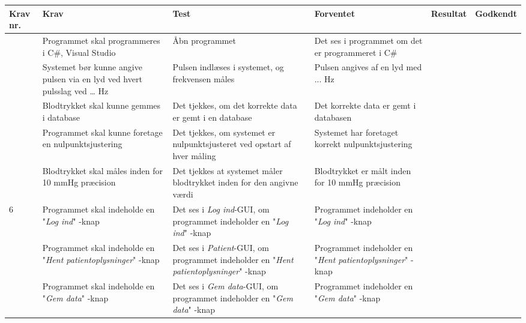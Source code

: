 \begin{longtable}{|>{\raggedright\arraybackslash}p{1.1cm}| >{\raggedright\arraybackslash}p{2.7cm} | >{\raggedright\arraybackslash}p{2.7cm} | >{\raggedright\arraybackslash}p{2.7cm} | >{\raggedright\arraybackslash}p{2.2cm} |>{\raggedright\arraybackslash}p{2.2cm}|}
   \hline
\textbf{Krav nr.} & \textbf{Krav}	&	\textbf{Test}	&	\textbf{Forventet}	&\textbf{Resultat}	&	\textbf{Godkendt} \\
\hline
1	&	Programmet skal programmeres i C$\#$, Visual Studio &	 Åbn programmet	& 	Det ses i programmet om det er programmeret i C$\#$	&	\\
\hline
2	&	Systemet bør kunne angive pulsen via en lyd ved hvert pulsslag ved … Hz &	 Pulsen indlæses i systemet, og frekvensen måles 	&	Pulsen angives af en lyd med ... Hz	&	\\
\hline
3	&	Blodtrykket skal kunne gemmes i database &	 Det tjekkes, om det korrekte data er gemt i en database 	&	Det korrekte data er gemt i databasen	&	\\
\hline
4	&	Programmet skal kunne foretage en nulpunktsjustering &	 Det tjekkes, om systemet er nulpunktsjusteret ved opstart af hver måling 	&	Systemet har foretaget korrekt nulpunktsjustering	&	\\
\hline
5	&	Blodtrykket skal måles inden for 10 mmHg præcision &	 Det tjekkes at systemet måler blodtrykket inden for den angivne værdi 	&	Blodtrykket er målt inden for 10 mmHg præcision	&	\\
\hline
6	&	Programmet skal indeholde en "\textit{Log ind}"\- -knap &	 Det ses i \textit{Log ind}-GUI, om programmet indeholder en "\textit{Log ind}"\- -knap 	&	Programmet indeholder en "\textit{Log ind}"\- -knap	&	\\
\hline
7	&	Programmet skal indeholde en "\textit{Hent patientoplysninger}"\- -knap &	 Det ses i \textit{Patient}-GUI, om programmet indeholder en "\textit{Hent patientoplysninger}"\- -knap 	&	Programmet indeholder en "\textit{Hent patientoplysninger}"\- -knap	&	\\
\hline
8	&	Programmet skal indeholde en "\textit{Gem data}"\- -knap &	 Det ses i \textit{Gem data}-GUI, om programmet indeholder en "\textit{Gem data}"\- -knap 	&	Programmet indeholder en "\textit{Gem data}"\- -knap	&	\\

\end{longtable}
